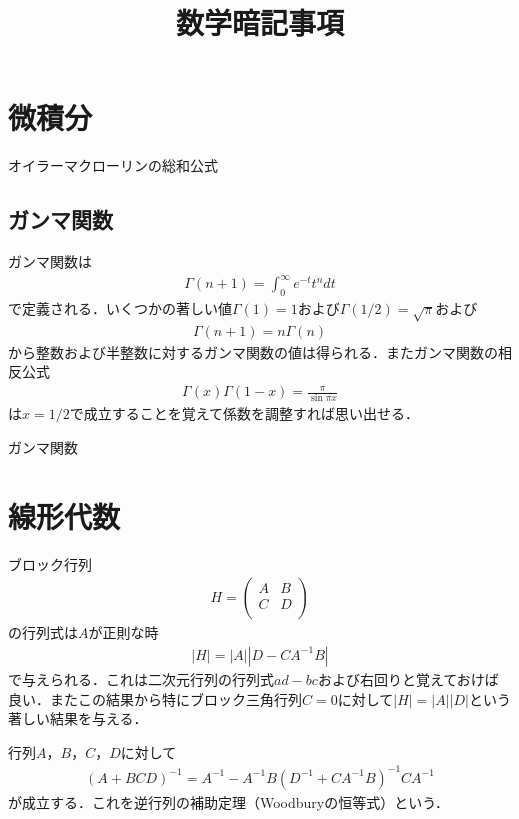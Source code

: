 \documentclass[a4j]{jarticle}
\title{数学暗記事項}
\begin{document}
\maketitle

\section{微積分}
オイラーマクローリンの総和公式

\subsection{ガンマ関数}
ガンマ関数は
\begin{align*}
 \Gamma (n+1)=\int_{0}^{\infty}e^{-t}t^ndt
\end{align*}
で定義される．いくつかの著しい値$\Gamma (1)=1$および$\Gamma (1/2)=\sqrt{\pi}$および
\begin{align*}
 \Gamma (n+1)=n\Gamma (n)
\end{align*}
から整数および半整数に対するガンマ関数の値は得られる．またガンマ関数の相反公式
\begin{align*}
 \Gamma (x)\Gamma (1-x)=\frac{\pi}{\sin \pi x}
\end{align*}
は$x=1/2$で成立することを覚えて係数を調整すれば思い出せる．

ガンマ関数

\section{線形代数}
ブロック行列
\begin{align*}
 H=\left(
 \begin{array}{cc}
  A&B \\
  C&D \\
 \end{array}\right)
\end{align*}
の行列式は$A$が正則な時
\begin{align*}
 |H|=|A||D-CA^{-1}B|
\end{align*}
で与えられる．これは二次元行列の行列式$ad-bc$および右回りと覚えておけば良い．またこの結果から特にブロック三角行列$C=0$に対して$|H|=|A||D|$という著しい結果を与える．

行列$A$，$B$，$C$，$D$に対して
\begin{align*}
 \left(A+BCD\right)^{-1}=A^{-1}-A^{-1}B\left(D^{-1}+CA^{-1}B\right)^{-1}CA^{-1}
\end{align*}
が成立する．これを逆行列の補助定理（Woodburyの恒等式）という．
\end{document}
